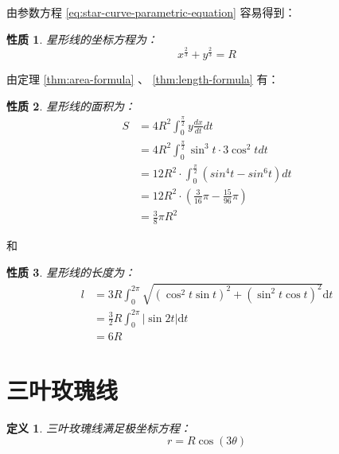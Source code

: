 \documentclass[11pt]{article}
\newtheorem{definition}{定义}
\newtheorem{property}{性质}
\numberwithin{equation}{section}
\numberwithin{theorem}{section}
\begin{document}
由参数方程 \eqref{eq:star-curve-parametric-equation} 容易得到：

\begin{property}\label{prop:star-curve-coordinate-equation}
  星形线的坐标方程为：
  \begin{equation}\label{eq:star-curve-coordinate-equation}
    x ^ {\frac{2}{3}} + y ^ {\frac{2}{3}} = R
  \end{equation}
\end{property}

由定理 \ref{thm:area-formula} 、 \ref{thm:length-formula} 有：

\begin{property}\label{prop:star-curve-area}
  星形线的面积为：
  \begin{equation}\label{eq:star-curve-area}
    \begin{aligned}
      S &= 4R^2 \int_{0}^{\frac{\pi}{2}} y \frac{dx}{dt} dt \\
      &= 4R^2 \int_{0}^{\frac{\pi}{2}} \sin^3t \cdot 3\cos^2t dt \\
      &= 12R^2 \cdot \int_{0}^{\frac{\pi}{2}} (sin^4t - sin^6t) dt \\
      &= 12R^2 \cdot \left( \frac{3}{16}\pi - \frac{15}{96}\pi \right) \\
      &= \frac{3}{8} \pi R^2
    \end{aligned}
  \end{equation}
\end{property}

和

\begin{property}\label{prop:star-curve-length}
  星形线的长度为：
  \begin{equation}\label{eq:star-curve-length}
    \begin{aligned}
      l &= 3R \int_0^{2\pi} \sqrt{(\cos^2t\sin t)^2 + (\sin^2t\cos t)^2} \mathrm{d}t \\
      &= \frac{3}{2}R\int_0^{2\pi}\left|\sin 2t\right| \mathrm{d}t \\
      &= 6R
    \end{aligned}
  \end{equation}
\end{property}

\section{三叶玫瑰线}\label{sec:three-leaved-rose}

\begin{definition}\label{def:three-leaved-rose}
  三叶玫瑰线满足极坐标方程：
  \begin{equation}\label{def:three-leaved-rose-polar-equation}
    r = R\cos(3\theta)
  \end{equation}
\end{definition}
\end{document}

